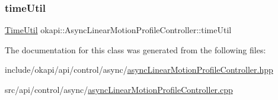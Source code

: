\subsubsection{\texorpdfstring{timeUtil}{timeUtil}}
{\footnotesize\ttfamily \mbox{\hyperlink{classokapi_1_1TimeUtil}{Time\+Util}} okapi\+::\+Async\+Linear\+Motion\+Profile\+Controller\+::time\+Util\hspace{0.3cm}{\ttfamily [protected]}}



The documentation for this class was generated from the following files\+:\begin{DoxyCompactItemize}
\item 
include/okapi/api/control/async/\mbox{\hyperlink{asyncLinearMotionProfileController_8hpp}{async\+Linear\+Motion\+Profile\+Controller.\+hpp}}\item 
src/api/control/async/\mbox{\hyperlink{asyncLinearMotionProfileController_8cpp}{async\+Linear\+Motion\+Profile\+Controller.\+cpp}}\end{DoxyCompactItemize}
